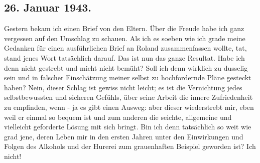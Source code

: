 \subsection{26. Januar 1943.}

Gestern bekam ich einen Brief von den Eltern.
\"{U}ber die Freude habe ich ganz vergessen auf den Umschlag zu schauen.
Als ich es soeben wie ich grade meine Gedanken f\"{u}r einen ausf\"{u}hrlichen Brief an Roland zusammenfassen wollte, tat, stand jenes Wort tats\"{a}chlich darauf.
Das ist nun das ganze Resultat.
Habe ich denn nicht gestrebt und micht nicht bem\"{u}ht?
Soll ich denn wirklich zu dusselig sein und in falscher Einsch\"{a}tzung meiner selbst zu hochfordernde Pl\"{a}ne gesteckt haben?
Nein, dieser Schlag ist gewiss nicht leicht; es ist die Vernichtung jedes selbstbewussten und sicheren Gef\"{u}hls, \"{u}ber seine Arbeit die innere Zufriedenheit zu empfinden, wenn - ja es gibt einen Ausweg: aber dieser wiederstrebt mir, eben weil er einmal so bequem ist und zum anderen die seichte, allgemeine und vielleicht geforderte L\"{o}sung mit sich bringt.
Bin ich denn tats\"{a}chlich so weit wie grad jene, deren Leben mir in den ersten Jahren unter den Einwirkungen und Folgen des Alkohols und der Hurerei zum grauenhaften Beispiel geworden ist?
Ich nicht!


\clearpage
